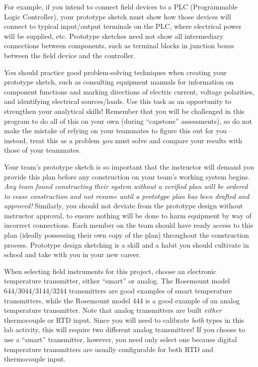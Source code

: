 \documentclass[12pt,a4paper]{article}
\begin{document}
\begin{itemize}
For example, if you intend to connect field devices to a PLC (Programmable Logic Controller), your prototype sketch must show how those devices will connect to typical input/output terminals on the PLC, where electrical power will be supplied, etc.  Prototype sketches need not show all intermediary connections between components, such as terminal blocks in junction boxes between the field device and the controller.

You should practice good problem-solving techniques when creating your prototype sketch, such as consulting equipment manuals for information on component functions and marking directions of electric current, voltage polarities, and identifying electrical sources/loads.  Use this task as an opportunity to strengthen your analytical skills!  Remember that you will be challenged in this program to do all of this on your own (during ``capstone'' assessments), so do not make the mistake of relying on your teammates to figure this out for you -- instead, treat this as a problem {\it you} must solve and compare your results with those of your teammates.

Your team's prototype sketch is so important that the instructor will demand you provide this plan before any construction on your team's working system begins.  {\it Any team found constructing their system without a verified plan will be ordered to cease construction and not resume until a prototype plan has been drafted and approved!}  Similarly, you should not deviate from the prototype design without instructor approval, to ensure nothing will be done to harm equipment by way of incorrect connections.  Each member on the team should have ready access to this plan (ideally possessing their own copy of the plan) throughout the construction process.  Prototype design sketching is a skill and a habit you should cultivate in school and take with you in your new career.

\vskip 10pt

When selecting field instruments for this project, choose an electronic temperature transmitter, either ``smart'' or analog.  The Rosemount model 644/3044/3144/3244 transmitters are good examples of smart temperature transmitters, while the Rosemount model 444 is a good example of an analog temperature transmitter.  Note that analog transmitters are built {\it either} thermocouple or RTD input.  Since you will need to calibrate {\it both} types in this lab activity, this will require two different analog transmitters!  If you choose to use a ``smart'' transmitter, however, you need only select one because digital temperature transmitters are usually configurable for both RTD and thermocouple input.


\end{itemize}
\end{document}

